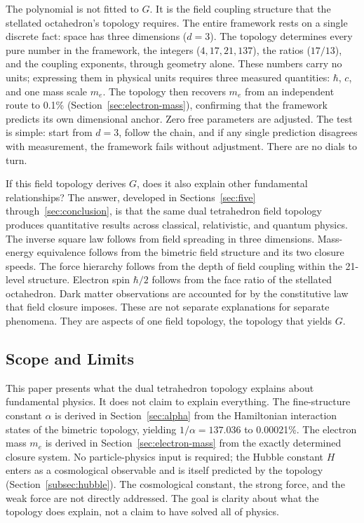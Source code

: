 \documentclass[aps,prd,preprint,superscriptaddress,showpacs,preprintnumbers,amsmath,amssymb,nofootinbib]{revtex4-2}
\begin{document}
The polynomial is not fitted to $G$. It is the field coupling structure that the stellated octahedron's topology requires. The entire framework rests on a single discrete fact: space has three dimensions ($d = 3$). The topology determines every pure number in the framework, the integers ($4, 17, 21, 137$), the ratios ($17/13$), and the coupling exponents, through geometry alone. These numbers carry no units; expressing them in physical units requires three measured quantities: $\hbar$, $c$, and one mass scale $m_e$. The topology then recovers $m_e$ from an independent route to 0.1\% (Section~\ref{sec:electron-mass}), confirming that the framework predicts its own dimensional anchor. Zero free parameters are adjusted. The test is simple: start from $d = 3$, follow the chain, and if any single prediction disagrees with measurement, the framework fails without adjustment. There are no dials to turn.

If this field topology derives $G$, does it also explain other fundamental relationships? The answer, developed in Sections~\ref{sec:five} through~\ref{sec:conclusion}, is that the same dual tetrahedron field topology produces quantitative results across classical, relativistic, and quantum physics. The inverse square law follows from field spreading in three dimensions. Mass-energy equivalence follows from the bimetric field structure and its two closure speeds. The force hierarchy follows from the depth of field coupling within the 21-level structure. Electron spin $\hbar/2$ follows from the face ratio of the stellated octahedron. Dark matter observations are accounted for by the constitutive law that field closure imposes. These are not separate explanations for separate phenomena. They are aspects of one field topology, the topology that yields $G$.

\subsection{Scope and Limits}
\label{subsec:limits}

This paper presents what the dual tetrahedron topology explains about fundamental physics. It does not claim to explain everything. The fine-structure constant $\alpha$ is derived in Section~\ref{sec:alpha} from the Hamiltonian interaction states of the bimetric topology, yielding $1/\alpha = 137.036$ to 0.00021\%. The electron mass $m_e$ is derived in Section~\ref{sec:electron-mass} from the exactly determined closure system. No particle-physics input is required; the Hubble constant $H$ enters as a cosmological observable and is itself predicted by the topology (Section~\ref{subsec:hubble}). The cosmological constant, the strong force, and the weak force are not directly addressed. The goal is clarity about what the topology does explain, not a claim to have solved all of physics.
\end{document}
